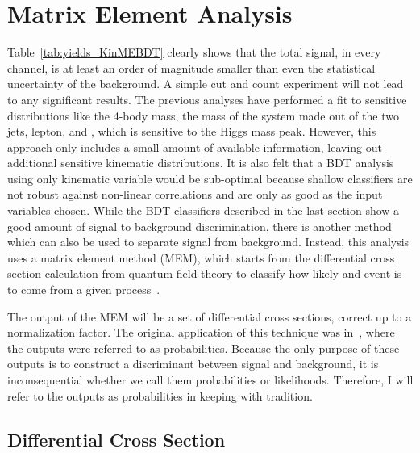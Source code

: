 \section{Matrix Element Analysis}

Table~\ref{tab:yields_KinMEBDT} clearly shows that the total signal, in every channel, is at least an order of magnitude smaller than even the statistical uncertainty of the background.
A simple cut and count experiment will not lead to any significant results.
The previous \HWWlnujj analyses have performed a fit to sensitive distributions like the 4-body mass, the mass of the system made out of the two jets, lepton, and \ETslash, which is sensitive to the Higgs mass peak.
However, this approach only includes a small amount of available information, leaving out additional sensitive kinematic distributions.
It is also felt that a BDT analysis using only kinematic variable would be sub-optimal because shallow classifiers are not robust against non-linear correlations and are only as good as the input variables chosen.
While the BDT classifiers described in the last section show a good amount of signal to background discrimination, there is another method which can also be used to separate signal from background.
Instead, this analysis uses a matrix element method (MEM), which starts from the differential cross section calculation from quantum field theory to classify how likely and event is to come from a given process~\cite{Canelli2003,Dong2008}.

The output of the MEM will be a set of differential cross sections, correct up to a normalization factor.
The original application of this technique was in~\cite{Canelli2003}, where the outputs were referred to as probabilities.
Because the only purpose of these outputs is to construct a discriminant between signal and background, it is inconsequential whether we call them probabilities or likelihoods.
Therefore, I will refer to the outputs as probabilities in keeping with tradition.

\subsection{Differential Cross Section}

